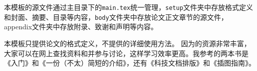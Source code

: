本模板的源文件通过主目录下的\texttt{main.tex}统一管理，\texttt{setup}文件夹中存放格式定义和封面、摘要、目录等内容，\texttt{body}文件夹中存放论文正文章节的源文件，appendix文件夹中存放附录、致谢和声明等内容。

\begin{mdframed}
本模板只提供论文的格式定义，不提供的详细使用方法。
因为的资源非常丰富，大家可以在网上查找资料和并参与讨论，这样学习效率更高。我参考的两本书是《入门》\cite{Liu_2013_LaTeXRuMen}和《一份（不太）简短的介绍》\cite{Oetiker_2019_YiFenBuTaiJianDuanDeLaTeX2eJieShao}，还有《科技文档排版》\cite{Gai_2005_LaTeXKeJiWenDangPaiBan}和《插图指南》\cite{Reckdahl_2017_LaTeX2eChaTuZhiNan}。
\end{mdframed}
